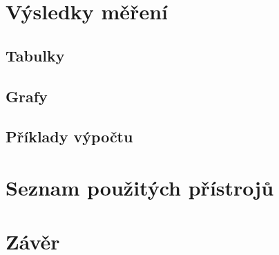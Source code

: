 \documentclass[a4paper, czech]{article}
\begin{document}
\section{Výsledky měření}
 
\subsection{Tabulky}

\subsection{Grafy}

\subsection{Příklady výpočtu}

\section{Seznam použitých přístrojů}

\section{Závěr}
\end{document}
